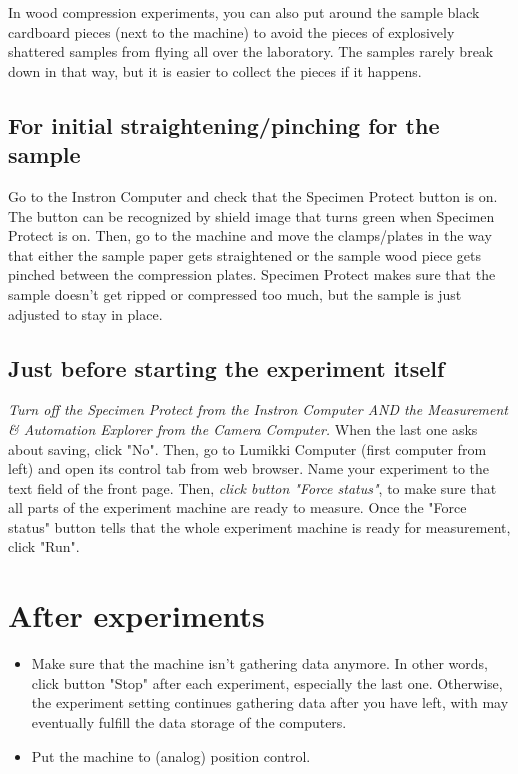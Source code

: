 \documentclass[a4paper]{article}
\begin{document}
In wood compression experiments, you can also put around the sample black cardboard
pieces (next to the machine) to avoid the pieces of explosively shattered samples
from flying all over the laboratory. The samples rarely break down in that way,
but it is easier to collect the pieces if it happens.

\subsection{For initial straightening/pinching for the sample} 

Go to the Instron Computer and check that the Specimen Protect button is on. 
The button can be recognized by shield image that turns green when Specimen 
Protect is on. Then, go to the machine and move the clamps/plates in the way 
that either the sample paper gets straightened or the sample wood piece gets 
pinched between the compression plates. Specimen Protect makes sure that the 
sample doesn't get ripped or compressed too much, but the sample is just 
adjusted to stay in place.

\subsection{Just before starting the experiment itself} 
\textit{Turn off the Specimen Protect from the Instron Computer AND the Measurement 
\& Automation Explorer from the Camera Computer.} When the last one asks about 
saving, click "No". Then, go to Lumikki Computer (first computer from left) and 
open its control tab from web browser. Name your experiment to the text field of 
the front page. Then, \textit{click button "Force status"}, to make sure that all 
parts of the experiment machine are ready to measure. Once the "Force status" 
button tells that the whole experiment machine is ready for measurement, click "Run".

\section{After experiments}

\begin{itemize}
  \item Make sure that the machine isn't gathering data anymore. In other words, click button "Stop" after each experiment, especially the last one. Otherwise, the experiment setting continues gathering data after you have left, with may eventually fulfill the data storage of the computers.
  \item Put the machine to (analog) position control.
\end{itemize}
\end{document}
